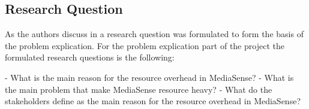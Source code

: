 \subsection{Research Question}
As the authors discuss in \cite{johannesson2012design} a research question was formulated to form the basis of the problem explication. For the problem explication part of the project the formulated research questions is the following: 

- What is the main reason for the resource overhead in MediaSense?
- What is the main problem that make MediaSense resource heavy? 
- What do the stakeholders define as the main reason for the resource overhead in MediaSense?

